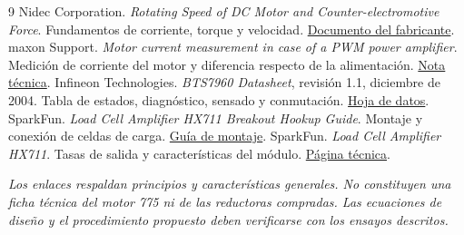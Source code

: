 \documentclass[11pt,a4paper]{article}
\begin{document}
\begin{thebibliography}{9}
 Nidec Corporation. \textit{Rotating Speed of DC Motor and Counter-electromotive Force}. Fundamentos de corriente, torque y velocidad. \href{https://www.nidec.com/en/technology/motor/basic/00013/}{Documento del fabricante}.
 maxon Support. \textit{Motor current measurement in case of a PWM power amplifier}. Medición de corriente del motor y diferencia respecto de la alimentación. \href{https://support.maxongroup.com/hc/en-us/articles/360012273994-Motor-current-measurement-in-case-of-a-PWM-power-amplifier}{Nota técnica}.
 Infineon Technologies. \textit{BTS7960 Datasheet}, revisión 1.1, diciembre de 2004. Tabla de estados, diagnóstico, sensado y conmutación. \href{https://www.infineon.com/assets/row/public/documents/10/57/infineon-bts7960-ds-en.pdf}{Hoja de datos}.
 SparkFun. \textit{Load Cell Amplifier HX711 Breakout Hookup Guide}. Montaje y conexión de celdas de carga. \href{https://learn.sparkfun.com/tutorials/load-cell-amplifier-hx711-breakout-hookup-guide/all}{Guía de montaje}.
 SparkFun. \textit{Load Cell Amplifier HX711}. Tasas de salida y características del módulo. \href{https://www.sparkfun.com/sparkfun-load-cell-amplifier-hx711.html}{Página técnica}.
\end{thebibliography}
\textit{Los enlaces respaldan principios y características generales. No constituyen una ficha técnica del motor 775 ni de las reductoras compradas. Las ecuaciones de diseño y el procedimiento propuesto deben verificarse con los ensayos descritos.}
\end{document}
